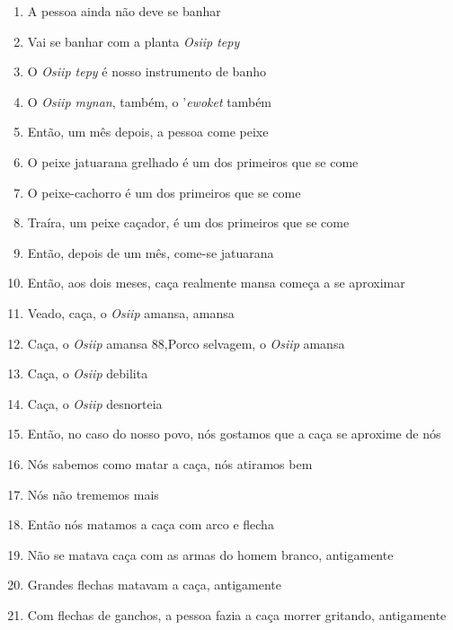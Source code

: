\begin{enumerate}
 \begin{center}\end{center}
 
 \item A pessoa ainda não deve se banhar
 \item Vai se banhar com a planta \textit{Osiip tepy}
 \item O \textit{Osiip tepy} é nosso instrumento de banho
 \item O \textit{Osiip mynan}, também, o '\textit{ewoket} também
 
 \begin{center}\end{center}
 
 \item Então, um mês depois, a pessoa come peixe
 \item O peixe jatuarana grelhado é um dos primeiros que se come
 \item O peixe-cachorro é um dos primeiros que se come
 \item Traíra, um peixe caçador, é um dos primeiros que se come
 \item Então, depois de um mês, come-se jatuarana
 
 \begin{center}\end{center}
 
 \item Então, aos dois meses, caça realmente mansa começa a se aproximar
 \item Veado, caça, o \textit{Osiip} amansa, amansa
 \item Caça, o \textit{Osiip} amansa
 88,Porco selvagem, o \textit{Osiip} amansa
 \item Caça, o \textit{Osiip} debilita
 \item Caça, o \textit{Osiip} desnorteia
 \item Então, no caso do nosso povo, nós gostamos que a caça se aproxime de nós
 
 \begin{center}\end{center}
 
 \item Nós sabemos como matar a caça, nós atiramos bem
 \item Nós não trememos mais
 \item Então nós matamos a caça com arco e flecha
 \item Não se matava caça com as armas do homem branco, antigamente
 \item Grandes flechas matavam a caça, antigamente
 \item Com flechas de ganchos, a pessoa fazia a caça morrer gritando, antigamente
 

\end{enumerate}
